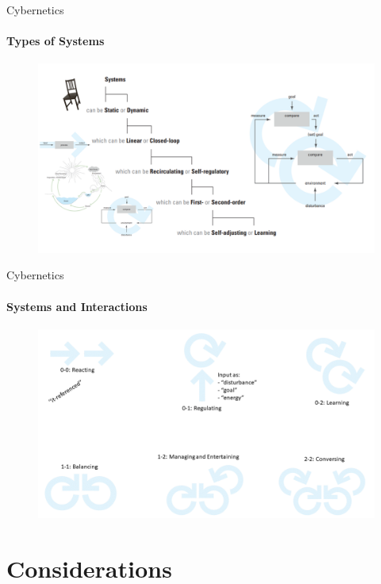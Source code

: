 \documentclass[
	11pt,
	aspectratio=169,
]{beamer}
\begin{document}
            \begin{frame}{Cybernetics}
                \framesubtitle{Types of Systems}
        		\begin{figure}
        		    \centering
        		    \includegraphics[height=0.8\textheight]{resources/systems.PNG}
        		\end{figure}
            \end{frame}
            \begin{frame}{Cybernetics}
                \framesubtitle{Systems and Interactions}
        		\begin{figure}
        		    \centering
        		    \includegraphics[height=0.8\textheight]{resources/interaction.PNG}
        		\end{figure}
            \end{frame}
    \section{Considerations}
\end{document}
